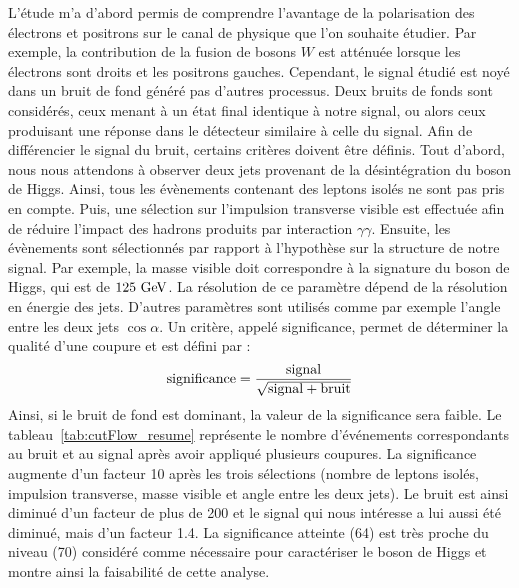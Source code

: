   L'étude m'a d'abord permis de comprendre l'avantage de la polarisation des électrons et positrons sur le canal de physique que l'on souhaite étudier.
  Par exemple, la contribution de la fusion de bosons $W$ est atténuée lorsque les électrons sont droits et les positrons gauches.
  Cependant, le signal étudié est noyé dans un bruit de fond généré pas d'autres processus.
  Deux bruits de fonds sont considérés, ceux menant à un état final identique à notre signal, ou alors ceux produisant une réponse dans le détecteur similaire à celle du signal.
  Afin de différencier le signal du bruit, certains critères doivent être définis.
  Tout d'abord, nous nous attendons à observer deux jets provenant de la désintégration du boson de Higgs. 
  Ainsi, tous les évènements contenant des leptons isolés ne sont pas pris en compte.
  Puis, une sélection sur l'impulsion transverse visible est effectuée afin de réduire l'impact des hadrons produits par interaction $\gamma\gamma$.
  Ensuite, les évènements sont sélectionnés par rapport à l'hypothèse sur la structure de notre signal.
  Par exemple, la masse visible doit correspondre à la signature du boson de Higgs, qui est de $125~\rm{GeV}$.
  La résolution de ce paramètre dépend de la résolution en énergie des jets. 
  D'autres paramètres sont utilisés comme par exemple l'angle entre les deux jets $\cos{\alpha}$.
  Un critère, appelé significance, permet de déterminer la qualité d'une coupure et est défini par :
  \begin{equation}
    \rm{significance} = \frac{\rm{signal}}{\sqrt{\rm{signal} + \rm{bruit}}}
  \end{equation}
  Ainsi, si le bruit de fond est dominant, la valeur de la significance sera faible.
  Le tableau~\ref{tab:cutFlow_resume} représente le nombre d'événements correspondants au bruit et au signal après avoir appliqué plusieurs coupures.
  La significance augmente d'un facteur 10 après les trois sélections (nombre de leptons isolés, impulsion transverse, masse visible et angle entre les deux jets).
  Le bruit est ainsi diminué d'un facteur de plus de 200 et le signal qui nous intéresse a lui aussi été diminué, mais d'un facteur 1.4. 
  La significance atteinte (64) est très proche du niveau (70) considéré comme nécessaire pour caractériser le boson de Higgs et montre ainsi la faisabilité de cette analyse.

